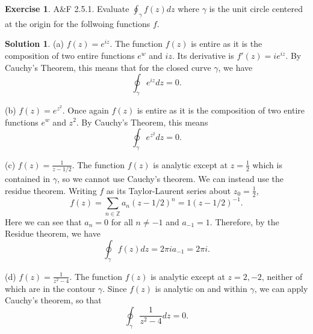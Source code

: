 \documentclass[12pt]{article}
\newcommand{\bbZ}{\mathbb{Z}}
\theoremstyle{definition}
\newtheorem{exer}{Exercise}
\newtheorem{sol}{Solution}
\theoremstyle{remark}
\begin{document}
\begin{exer}
    A\&F 2.5.1. Evaluate $\oint_\gamma f(z)dz$ where $\gamma$ is the unit circle centered at the origin for the follwoing functions $f$.
\end{exer}
\begin{sol}\leavevmode

    (a) $f(z) = e^{iz}$. The function $f(z)$ is entire as it is the composition of two entire functions $e^{w}$ and $iz$. Its derivative is $f'(z) = ie^{iz}$. By Cauchy's Theorem, this means that for the closed curve $\gamma$, we have
    \begin{equation}
        \oint_\gamma e^{iz}dz = 0.
    \end{equation} 

    (b) $f(z) = e^{z^2}$. Once again $f(z)$ is entire as it is the composition of two entire functions $e^{w}$ and $z^2$. By Cauchy's Theorem, this means
    \begin{equation}
        \oint_\gamma e^{z^2}dz = 0.
    \end{equation}

    (c) $f(z) = \frac{1}{z-1/2}$. The function $f(z)$ is analytic except at $z = \frac{1}{2}$ which is contained in $\gamma$, so we cannot use Cauchy's theorem. We can instead use the residue theorem. Writing $f$ as its Taylor-Laurent series about $z_0 = \frac{1}{2}$,
    \begin{equation}
        f(z) = \sum_{n\in\bbZ} a_n (z-1/2)^n = 1 (z - 1/2)^{-1}.
    \end{equation}
    Here we can see that $a_n = 0$ for all $n\neq -1$ and $a_{-1} = 1$. Therefore, by the Residue theorem, we have
    \begin{equation}
        \oint_\gamma f(z) dz=  2\pi i a_{-1} = 2\pi i.
    \end{equation}

    (d) $f(z) = \frac{1}{z^2-4}$. The function $f(z)$ is analytic except at $z = 2, -2$, neither of which are in the contour $\gamma$. Since $f(z)$ is analytic on and within $\gamma$, we can apply Cauchy's theorem, so that
    \begin{equation}
        \oint_\gamma \frac{1}{z^2-4}dz = 0.
    \end{equation}


\end{sol}
\end{document}

